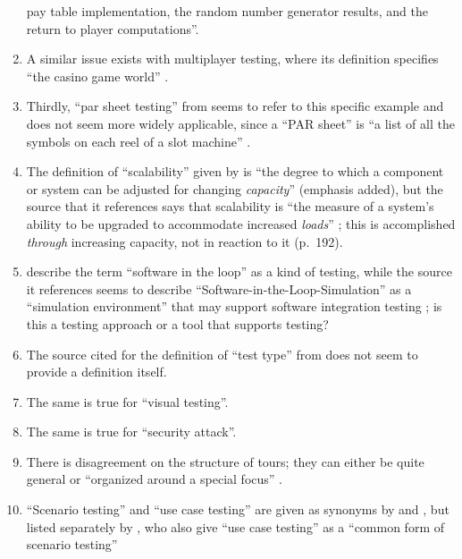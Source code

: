 \begin{enumerate}
            pay table implementation, the random number generator results, and
            the return to player computations''.
      \item A similar issue exists with multiplayer testing, where its
            definition specifies ``the casino game world'' \citepISTQB{}.
      \item Thirdly, ``par sheet testing'' from \citepISTQB{} seems to
            refer to this specific example and does not seem more widely
            applicable, since a ``PAR sheet'' is ``a list of all the symbols
            on each reel of a slot machine'' \citep{Bluejay2024}.
      \item The definition of ``scalability'' given by \citetISTQB{} is
            ``the degree to which a component or system can be adjusted for
            changing \emph{capacity}'' (emphasis added), but the source that it
            references says that scalability is ``the measure of a system's
            ability to be upgraded to accommodate increased \emph{loads}''
            \citep[p.~381,~emphasis added]{GerrardAndThompson2002}; this is
            accomplished \emph{through} increasing capacity, not in reaction to
            it (p.~192).
      \item \citetISTQB{} describe the term ``software in the loop'' as a
            kind of testing, while the source it references seems to describe
            ``Software-in-the-Loop-Simulation'' as a ``simulation environment''
            that may support software integration testing
            \citep[p.~153]{SPICE2022}; is this a testing approach or a tool
            that supports testing?
      \item The source cited for the definition of ``test type'' from
            \citepISTQB{} does not seem to provide a definition itself.
      \item The same is true for ``visual testing''.
      \item The same is true for ``security attack''.
      \item There is disagreement on the structure of tours; they can either be
            quite general \citep[p.~34]{IEEE2022} or ``organized around a
            special focus'' \citepISTQB{}.
      \item ``Scenario testing'' and ``use case testing'' are given as synonyms
            by \citetISTQB{} and \citet[p.~47]{Kam2008}, but listed
            separately by \citet[p.~22]{IEEE2022}, who also give ``use case
            testing'' as a ``common form of scenario testing''

\end{enumerate}

